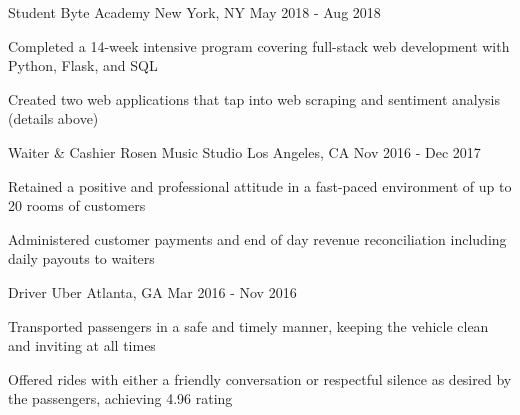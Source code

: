 

\begin{cventries}

  \cventry
    {Student} %
    {Byte Academy} %
    {New York, NY} %
    {May 2018 - Aug 2018} %
    {
      \begin{cvitems} %
        \item {Completed a 14-week intensive program covering full-stack web development with Python, Flask, and SQL}
        \item {Created two web applications that tap into web scraping and sentiment analysis (details above)}
      \end{cvitems}
    }

  \cventry
    {Waiter \& Cashier} %
    {Rosen Music Studio} %
    {Los Angeles, CA} %
    {Nov 2016 - Dec 2017} %
    {
      \begin{cvitems} %
        \item {Retained a positive and professional attitude in a fast-paced environment of up to 20 rooms of customers}
        \item {Administered customer payments and end of day revenue reconciliation including daily payouts to waiters}
      \end{cvitems}
    }

  \cventry
    {Driver} %
    {Uber} %
    {Atlanta, GA} %
    {Mar 2016 - Nov 2016} %
    {
      \begin{cvitems} %
        \item {Transported passengers in a safe and timely manner, keeping the vehicle clean and inviting at all times}
        \item {Offered rides with either a friendly conversation or respectful silence as desired by the passengers, achieving 4.96 rating}
      \end{cvitems}
    }


\end{cventries}
